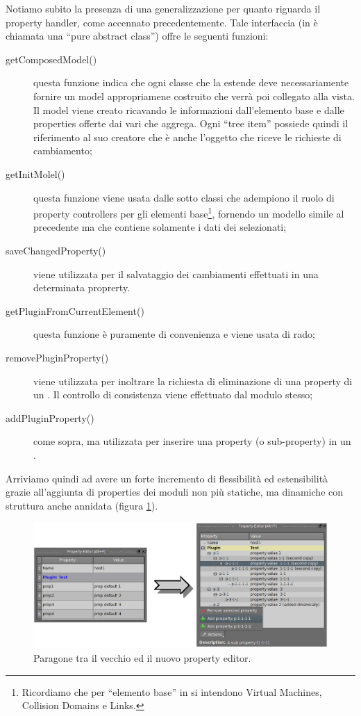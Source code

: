 Notiamo subito la presenza di una generalizzazione per quanto riguarda il property handler, come accennato precedentemente. Tale interfaccia (in \cpp{} è chiamata una ``pure abstract class'') offre le seguenti funzioni:
\begin{description}
\item[getComposedModel()]questa funzione indica che ogni classe che la estende deve necessariamente fornire un model appropriamene costruito che verrà poi collegato alla vista. Il model viene creato ricavando le informazioni dall'elemento base e dalle properties offerte dai vari \plugin{} che aggrega. Ogni ``tree item'' possiede quindi il riferimento al suo creatore che è anche l'oggetto che riceve le richieste di cambiamento;

\item[getInitMolel()]questa funzione viene usata dalle sotto classi che adempiono il ruolo di property controllers per gli elementi base\footnote{Ricordiamo che per ``elemento base'' in \visualnetkit{} si intendono Virtual Machines, Collision Domains e Links.}, fornendo un modello simile al precedente ma che contiene solamente i dati dei \plugin{} selezionati;

\item[saveChangedProperty()]viene utilizzata per il salvataggio dei cambiamenti effettuati in una determinata proprerty.

\item[getPluginFromCurrentElement()]questa funzione è puramente di convenienza e viene usata di rado;

\item[removePluginProperty()]viene utilizzata per inoltrare la richiesta di eliminazione di una property di un \plugin{}. Il controllo di consistenza viene effettuato dal modulo stesso;

\item[addPluginProperty()]come sopra, ma utilizzata per inserire una property (o sub-property) in un \plugin{}.
\end{description}

Arriviamo quindi ad avere un forte incremento di flessibilità ed estensibilità grazie all'aggiunta di properties dei moduli non più statiche, ma dinamiche con struttura anche annidata (figura \ref{figura:property_editor_paragone}).

\begin{figure}[!htb]
	\centering
	\includegraphics[width=12cm]{images/property_editors_paragone.png}
	\caption{Paragone tra il vecchio ed il nuovo property editor.}
	\label{figura:property_editor_paragone}
\end{figure}


